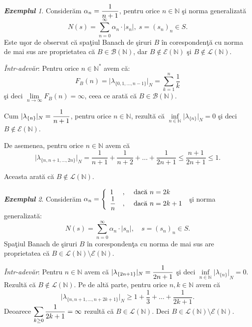 \documentclass[ a4paper, 12pt]{report}
\theoremstyle{definition}
\theoremstyle{remark}
\newtheorem{exemple}{\bf Exemplul}[section]
\numberwithin{equation}{section}
\begin{document}
\begin{exemple}
Consider\u am $\alpha_n=\displaystyle\frac{1}{n+1}$, pentru orice $n \in \mathbb{N}$ \c si norma generalizat\u a
$$N(s)=\sum\limits_{n=0}^{\infty}{\alpha_n \cdot \lvert s_n \rvert}, \; s = (s_n)_n \in S.$$
Este u\c sor de observat c\u a spa\c tiul Banach de \c siruri $B$ \^in coresponden\c t\u a cu norma de mai sus are proprietatea c\u a $B \in \mathcal{B}(\mathbb{N})$, dar $B \notin \mathcal{E}(\mathbb{N})$ \c si $B \notin \mathcal{L}(\mathbb{N})$.
\end{exemple}

{\it \^ Intr-adev\u ar}: Pentru orice $n \in \mathbb{N}^*$ avem c\u a:
$$F_B(n) = \lvert \lambda_{\{ 0, 1, \ldots, n - 1\}}\rvert_N = \sum\limits_{k = 1}^{n} \frac{1}{k}$$ \c si deci $\lim\limits_{n \to \infty}F_B(n) = \infty$, ceea ce arat\u a c\u a $B \in \mathcal{B}(\mathbb{N})$.

Cum $\lvert \lambda_{\{ n\}}\rvert_N = \displaystyle\frac{1}{n + 1}$, pentru orice $n \in \mathbb{N}$, rezult\u a c\u a $\inf\limits_{n \in \mathbb{N}}\lvert \lambda_{\{ n\}}\rvert_N = 0$ \c si deci
$B \notin \mathcal{E}(\mathbb{N})$.

De asemenea, pentru orice $n \in \mathbb{N}$ avem c\u a
$$\lvert \lambda_{\{ n, n + 1, \ldots, 2n\}} \rvert_N = \frac{1}{n + 1} + \frac{1}{n + 2} + \ldots + \frac{1}{2n + 1} \leq \frac{n + 1}{2n + 1} \leq 1.$$

Aceasta arat\u a c\u a $B \notin \mathcal{L}(\mathbb{N})$.


\begin{exemple}
Consider\u am $\alpha_n = \left\{ \begin{array}{lcl} 1&,& \hbox{ dac\u a } n=2k\\ \ds\frac{1}{n} &,& \hbox{ dac\u a } n = 2k + 1 \end{array}\right.$ \c si norma generalizat\u a:
$$N(s) = \sum\limits_{n=0}^{\infty} {\alpha_n \cdot \lvert s_n \rvert}, \quad s = (s_n)_n \in S.$$
Spa\c tiul Banach de \c siruri $B$ \^in coresponden\c ta cu norma de mai sus are proprietatea c\u a $B \in \mathcal{L}(\mathbb{N}) \setminus \mathcal{E}(\mathbb{N})$.
\end{exemple}

{\it \^ Intr-adev\u ar}: Pentru $n \in \mathbb{N}$ avem c\u a $\lvert \lambda_{\{ 2n + 1\}}\rvert_N = \displaystyle\frac{1}{2n + 1}$ \c si deci $\inf\limits_{n \in \mathbb{N}}{{\lvert \lambda_{\{n\}} \rvert}_N}=0$. Rezult\u a c\u a $B \notin \mathcal{L}(\mathbb{N})$. Pe de alt\u a parte, pentru orice $n, k \in \mathbb{N}$ avem c\u a
$$\lvert \lambda_{\{ n, n + 1, \ldots, n + 2k + 1\}}\rvert_N \geq 1 + \frac{1}{3} + \ldots + \frac{1}{2k + 1}.$$ Deoarece $\displaystyle\sum\limits_{k \geq 0} \displaystyle\frac{1}{2k + 1} = \infty$ rezult\u a c\u a $B \in \mathcal{L}(\mathbb{N})$. Deci $B \in \mathcal{L}(\mathbb{N}) \setminus \mathcal{E}(\mathbb{N})$.
\end{document}
